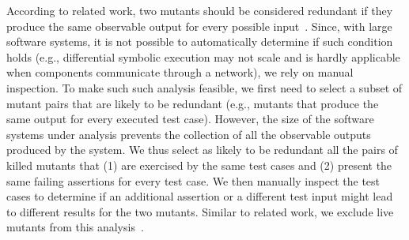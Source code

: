According to related work, two mutants should be considered redundant if they produce the same observable output for every possible input~\cite{Shin:TSE:DCriterion:2018}.
Since, with large software systems, it is not possible to automatically determine if such condition holds (e.g., differential symbolic execution may not scale and is hardly applicable when components communicate through a network), we rely on manual inspection. To make such such analysis feasible, we first need to select a subset of mutant pairs that are likely to be redundant (e.g., mutants that produce the same output for every executed test case). 
However, the size of the software systems under analysis prevents the collection of all the observable outputs produced by the system. 
We thus select as likely to be redundant all the pairs of killed mutants that (1) are exercised by the same test cases and (2) present the same failing assertions for every test case. We then manually inspect the test cases to determine if an additional assertion or a different test input might lead to different results for the two mutants. Similar to related work, we exclude live mutants from this analysis~\cite{papadakis2016threats}.


